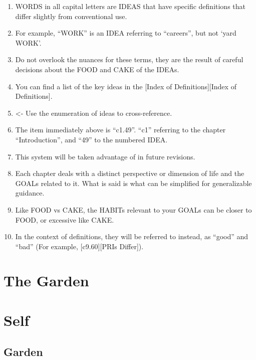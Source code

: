 \documentclass[
]{book}
\begin{document}
\begin{enumerate}
\def\labelenumi{\arabic{enumi}.}
\setcounter{enumi}{44}
\item
  WORDS in all capital letters are IDEAS that have specific definitions that differ
  slightly from conventional use.
\item
  For example, ``WORK'' is an IDEA referring to ``careers'', but not `yard WORK'.
\item
  Do not overlook the nuances for these terms, they are the result of careful decisions about the FOOD and CAKE of the IDEAs.
\item
  You can find a list of the key ideas in the {[}Index of Definitions{]}{[}Index of Definitions{]}.
\item
  \textless- Use the enumeration of ideas to cross-reference.
\item
  The item immediately above is ``c1.49''. ``c1'' referring to the chapter ``Introduction'', and ``49'' to the numbered IDEA.
\item
  This system will be taken advantage of in future revisions.
\item
  Each chapter deals with a distinct perspective or dimension of life and the GOALs related to it. What is said is what can be simplified for generalizable guidance.
\item
  Like FOOD vs CAKE, the HABITs relevant to your GOALs can be closer to FOOD, or excessive like CAKE.
\item
  In the context of definitions, they will be referred to instead, as ``good'' and ``bad'' (For example, {[}c9.60{]}{[}PRIs Differ{]}).
\end{enumerate}

\hypertarget{the-garden}{%
\chapter*{The Garden}\label{the-garden}}

\hypertarget{self}{%
\chapter{Self}\label{self}}

\hypertarget{garden}{%
\section{Garden}\label{garden}}
\end{document}
